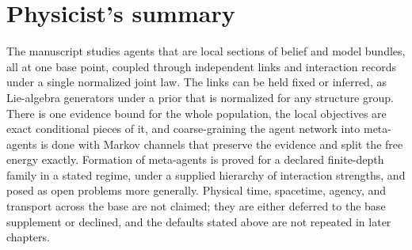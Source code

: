 \section*{Physicist's summary}

The manuscript studies agents that are local sections of belief and model bundles, all at one base point,
coupled through independent links and interaction records under a single normalized joint law. The links
can be held fixed or inferred, as Lie-algebra generators under a prior that is normalized for any structure
group. There is one
evidence bound for the whole population, the local objectives are exact conditional pieces of it, and
coarse-graining the agent network into meta-agents is done with Markov channels that preserve the evidence
and split the free energy exactly. Formation of meta-agents is proved for a declared finite-depth family in a
stated regime, under a supplied hierarchy of interaction strengths, and posed as open problems more generally. Physical time, spacetime, agency, and transport across the base
are not claimed; they are either deferred to the base supplement or declined, and the defaults stated above
are not repeated in later chapters.
